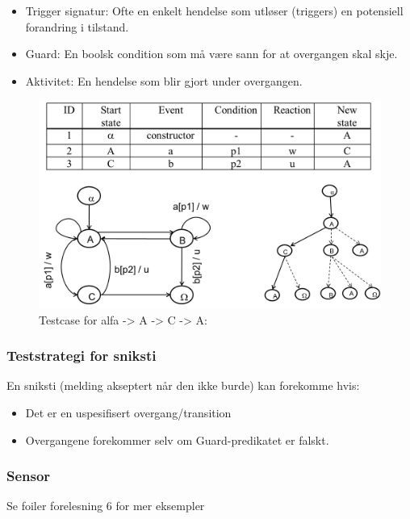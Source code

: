 \begin{itemize}
\item
  Trigger signatur: Ofte en enkelt hendelse som utløser (triggers) en
  potensiell forandring i tilstand.
\item
  Guard: En boolsk condition som må være sann for at overgangen skal
  skje.
\item
  Aktivitet: En hendelse som blir gjort under overgangen.
\end{itemize}
\begin{figure}[htbp]
\centering
\includegraphics{Forelesning 06/img/4.png}
\caption{Testcase for alfa -\textgreater{} A -\textgreater{} C
-\textgreater{} A:}
\end{figure}

\subsubsection{Teststrategi for sniksti}

En sniksti (melding akseptert når den ikke burde) kan forekomme hvis:

\begin{itemize}
\item
  Det er en uspesifisert overgang/transition
\item
  Overgangene forekommer selv om Guard-predikatet er falskt.
\end{itemize}
\subsubsection{Sensor}

Se foiler forelesning 6 for mer eksempler

